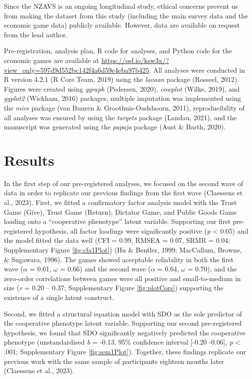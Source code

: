 \documentclass[
  man,floatsintext]{apa6}
\begin{document}
Since the NZAVS is an ongoing longitudinal study, ethical concerns prevent us
from making the dataset from this study (including the main survey data and the
economic game data) publicly available. However, data are available on request
from the lead author.

Pre-registration, analysis plan, R code for analyses, and Python code for the
economic games are available at
\url{https://osf.io/ksw3x/?view_only=597d9d552bc142f4a6d59e4eba97b425}. All analyses
were conducted in R version 4.2.1 (R Core Team, 2019) using the \emph{lavaan} package
(Rosseel, 2012). Figures were created using \emph{ggraph} (Pedersen, 2020), \emph{cowplot}
(Wilke, 2019), and \emph{ggplot2} (Wickham, 2016) packages, multiple imputation was
implemented using the \emph{mice} package (van Buuren \& Groothuis-Oudshoorn, 2011), reproducibility of all analyses
was ensured by using the \emph{targets} package (Landau, 2021), and the manuscript was
generated using the \emph{papaja} package (Aust \& Barth, 2020).

\hypertarget{results}{%
\section{Results}\label{results}}

In the first step of our pre-registered analyses, we focused on the
second wave of data in order to replicate our previous findings from the first
wave (Claessens et al., 2023). First, we fitted a confirmatory factor analysis model
with the Trust Game (Give), Trust Game (Return), Dictator Game, and Public
Goods Game loading onto a ``cooperative phenotype'' latent variable. Supporting
our first pre-registered hypothesis, all factor loadings were significantly
positive (\emph{p} \textless{} 0.05) and the model fitted the data well (CFI =
0.99, RMSEA =
0.07, SRMR =
0.04; Supplementary Figure
\ref{fig:cfa1Plot}) (Hu \& Bentler, 1999; MacCallum, Browne, \& Sugawara, 1996). The games showed acceptable
reliability in both the first wave (\(\alpha\) =
0.61, \(\omega\) =
0.66) and the second wave (\(\alpha\) =
0.64, \(\omega\) =
0.70), and the zero-order correlations
between games were all positive and small-to-medium in size (\emph{r} = 0.20 -- 0.37;
Supplementary Figure \ref{fig:plotCors}) supporting the existence of a single
latent construct.

Second, we fitted a structural equation model with SDO as the sole predictor of
the cooperative phenotype latent variable. Supporting our second pre-registered
hypothesis, we found that SDO significantly negatively predicted the cooperative
phenotype (unstandardised \emph{b} = -0.13, 95\% confidence interval
{[}-0.20 -0.06{]}, \emph{p} \textless{} .001;
Supplementary Figure \ref{fig:sem1Plot}). Together, these findings replicate
our previous work with the same sample of participants eighteen months later
(Claessens et al., 2023).
\end{document}
